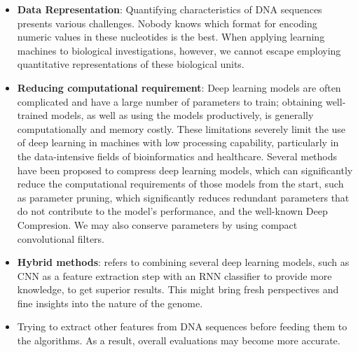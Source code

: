 \begin{itemize}
    \item \textbf{Data Representation}: Quantifying characteristics of DNA sequences presents various challenges. Nobody knows which format for encoding numeric values in these nucleotides is the best. When applying learning machines to biological investigations, however, we cannot escape employing quantitative representations of these biological units.
    
    \item \textbf{Reducing computational requirement}: Deep learning models are often complicated and have a large number of parameters to train; obtaining well-trained models, as well as using the models productively, is generally computationally and memory costly. These limitations severely limit the use of deep learning in machines with low processing capability, particularly in the data-intensive fields of bioinformatics and healthcare. Several methods have been proposed to compress deep learning models, which can significantly reduce the computational requirements of those models from the start, such as parameter pruning, which significantly reduces redundant parameters that do not contribute to the model's performance, and the well-known Deep Compresion. We may also conserve parameters by using compact convolutional filters.
    
    \item \textbf{Hybrid methods}: refers to combining several deep learning models, such as CNN as a feature extraction step with an RNN classifier to provide more knowledge, to get superior results. This might bring fresh perspectives and fine insights into the nature of the genome. 
    
    \item Trying to extract other features from DNA sequences before feeding them to the algorithms. As a result, overall evaluations may become more accurate.
\end{itemize}